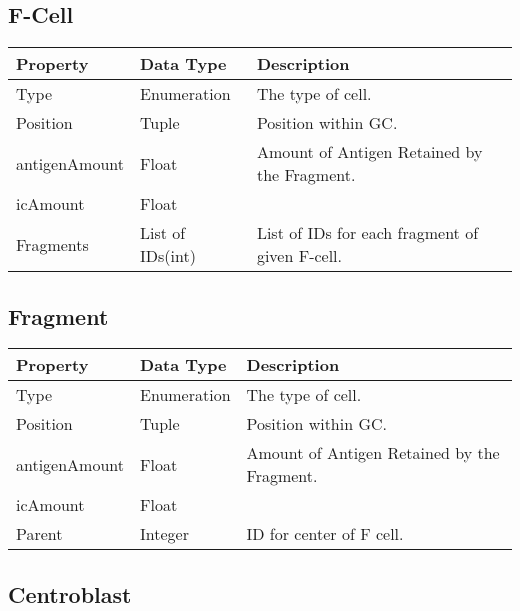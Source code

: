\documentclass[english]{article}
\begin{document}
\subsection{F-Cell}
\begin{center}
\begin{tabular}{|C{2.1in}|C{2.1in}|C{2.1in}|}

\hline
\textbf{Property} & \textbf{Data Type} & \textbf{Description}
\tabularnewline
\hline
\hline
Type & Enumeration & The type of cell. 
\tabularnewline
\hline
Position & Tuple & Position within GC.
\tabularnewline
\hline
antigenAmount & Float & Amount of Antigen Retained by the Fragment. 
\tabularnewline
\hline
icAmount & Float &
\tabularnewline
\hline
Fragments & List of IDs(int) & List of IDs for each fragment of given F-cell. 
\tabularnewline
\hline

\end{tabular}
\end{center}

\subsection{Fragment}
\begin{center}
\begin{tabular}{|C{2.1in}|C{2.1in}|C{2.1in}|}

\hline
\textbf{Property} & \textbf{Data Type} & \textbf{Description}
\tabularnewline
\hline
\hline
Type & Enumeration & The type of cell. 
\tabularnewline
\hline
Position & Tuple & Position within GC.
\tabularnewline
\hline
antigenAmount & Float & Amount of Antigen Retained by the Fragment. 
\tabularnewline
\hline
icAmount & Float &
\tabularnewline
\hline 
Parent & Integer & ID for center of F cell.  
\tabularnewline
\hline

\end{tabular}
\end{center}

\subsection{Centroblast}
\end{document}
